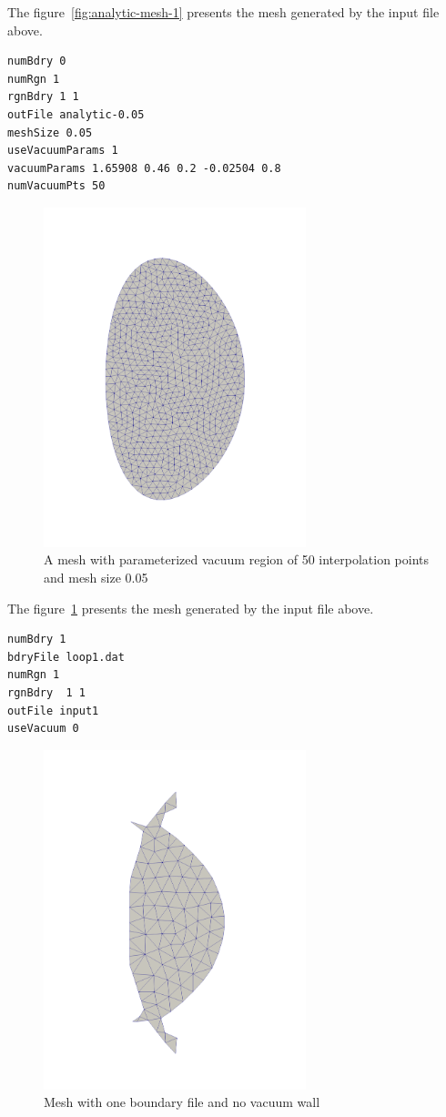 The figure~\ref{fig:analytic-mesh-1} presents the mesh generated by the input file above.

\begin{verbatim}
numBdry 0
numRgn 1
rgnBdry 1 1
outFile analytic-0.05
meshSize 0.05
useVacuumParams 1
vacuumParams 1.65908 0.46 0.2 -0.02504 0.8
numVacuumPts 50
\end{verbatim}

\begin{figure}
\centering
\includegraphics[width=3in]{./figures/meshgen-analytic-50pts-05.pdf}
\caption[Mesh with parameterized vacuum region II]
{A mesh with parameterized vacuum region of 50 interpolation points and mesh size 0.05}
\label{fig:analytic-mesh-2}
\end{figure}

The figure~\ref{fig:analytic-mesh-2} presents the mesh generated by the input file above.

\begin{verbatim}
numBdry 1
bdryFile loop1.dat
numRgn 1
rgnBdry  1 1
outFile input1
useVacuum 0
\end{verbatim}

\begin{figure}
\centering
\includegraphics[width=3in]{./figures/meshgen-input1-novacuum.pdf}
\caption[Mesh with one boundary file and no vacuum wall]{Mesh with one boundary file and no vacuum wall}
\label{fig:input1}
\end{figure}

